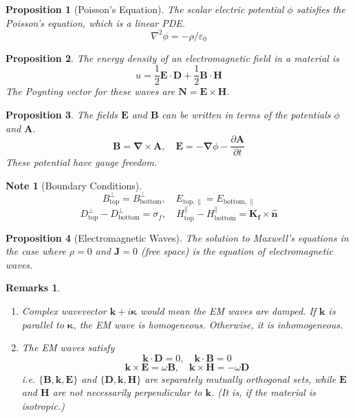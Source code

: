 \documentclass[a4paper]{article}
\newtheorem{remarks}{Remarks}[section]
\newtheorem{prop}{Proposition}[section]
\theoremstyle{new}
\newtheorem{Note}{Note}[section]
\begin{document}
\begin{prop}[Poisson's Equation]
The scalar electric potential $\phi$ satisfies the Poisson's equation, which is a linear PDE.
$$\nabla^2\phi=-\rho/\varepsilon_0$$
\end{prop}
\begin{prop}
The energy density of an electromagnetic field in a material is
$$u=\frac{1}{2}\mathbf{E}\cdot\mathbf{D}+\frac{1}{2}\mathbf{B}\cdot\mathbf{H}$$
The Poynting vector for these waves are $\mathbf{N}=\mathbf{E}\times\mathbf{H}$.
\end{prop}
\begin{prop}
The fields $\mathbf{E}$ and $\mathbf{B}$ can be written in terms of the potentials $\phi$ and $\mathbf{A}$. 
$$\mathbf{B}=\boldsymbol{\nabla}\times\mathbf{A},\quad\mathbf{E}=-\boldsymbol{\nabla}\phi-\frac{\partial\mathbf{A}}{\partial t}$$
These potential have gauge freedom.
\end{prop}
\begin{Note}[Boundary Conditions]
$$B_{\text{top}}^{\perp}=B_{\text{bottom}}^{\perp},\quad E_{\text{top},\parallel}=E_{\text{bottom},\parallel}$$
$$D_{\text{top}}^{\perp}-D_{\text{bottom}}^{\perp}=\sigma_f,\quad H_{\text{top}}^{\parallel}-H_{\text{bottom}}^{\parallel}=\mathbf{K_f}\times\mathbf{\hat{n}}$$
\end{Note}
\begin{prop}[Electromagnetic Waves]
The solution to Maxwell's equations in the case where $\rho=0$ and $\mathbf{J}=0$ (free space) is the equation of electromagnetic waves.
\end{prop}
\begin{remarks}\leavevmode
\begin{enumerate}
    \item Complex wavevector $\mathbf{k}+i\boldsymbol{\kappa}$ would mean the EM waves are damped. If $\mathbf{k}$ is parallel to $\boldsymbol{\kappa}$, the EM wave is homogeneous. Otherwise, it is inhomogeneous.
    \item The EM waves satisfy
    $$\mathbf{k}\cdot\mathbf{D}=0,\quad\mathbf{k}\cdot\mathbf{B}=0$$
    $$\mathbf{k}\times\mathbf{E}=\omega\mathbf{B},\quad\mathbf{k}\times\mathbf{H}=-\omega\mathbf{D}$$
    i.e. $\{\mathbf{B},\mathbf{k},\mathbf{E}\}$ and $\{\mathbf{D},\mathbf{k},\mathbf{H}\}$ are separately mutually orthogonal sets, while $\mathbf{E}$ and $\mathbf{H}$ are not necessarily perpendicular to $\mathbf{k}$. (It is, if the material is isotropic.)
\end{enumerate}
\end{remarks}
\end{document}
